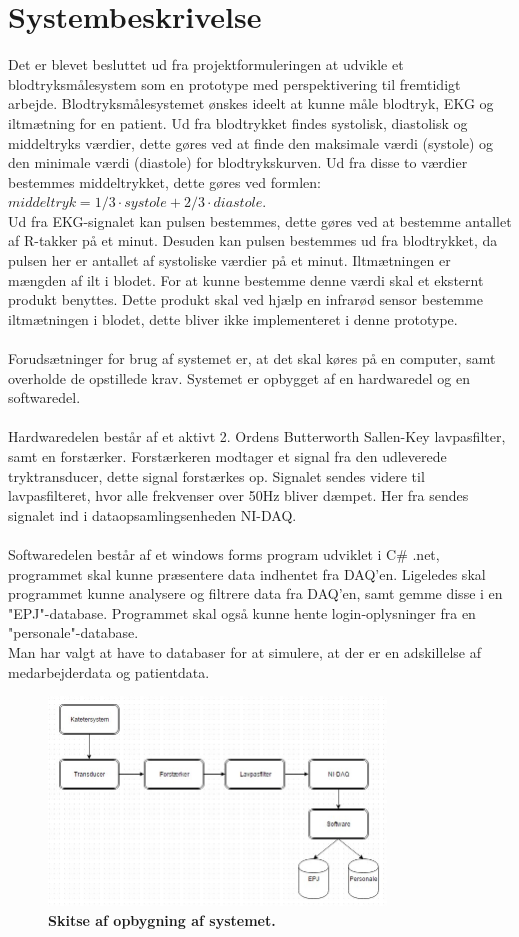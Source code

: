 \section{Systembeskrivelse}
Det er blevet besluttet ud fra projektformuleringen at udvikle et blodtryksmålesystem som en prototype med perspektivering til fremtidigt arbejde. Blodtryksmålesystemet ønskes ideelt at kunne måle blodtryk, EKG og iltmætning for en patient. Ud fra blodtrykket findes systolisk, diastolisk og middeltryks værdier, dette gøres ved at finde den maksimale værdi (systole) og den minimale værdi (diastole) for blodtrykskurven. Ud fra disse to værdier bestemmes middeltrykket, dette gøres ved formlen: $middeltryk = 1/3 \cdot systole + 2/3 \cdot diastole$. \cite{blodtrykwiki}
\\ 
Ud fra EKG-signalet kan pulsen bestemmes, dette gøres ved at bestemme antallet af R-takker på et minut. Desuden kan pulsen bestemmes ud fra blodtrykket, da pulsen her er antallet af systoliske værdier på et minut. Iltmætningen er mængden af ilt i blodet. For at kunne bestemme denne værdi skal et eksternt produkt benyttes. Dette produkt skal ved hjælp en infrarød sensor bestemme iltmætningen i blodet, dette bliver ikke implementeret i denne prototype.\\\\
Forudsætninger for brug af systemet er, at det skal køres på en computer, samt overholde de opstillede krav. Systemet er opbygget af en hardwaredel og en softwaredel. \\\\
Hardwaredelen består af et aktivt 2. Ordens Butterworth Sallen-Key lavpasfilter, samt en forstærker. Forstærkeren modtager et signal fra den udleverede tryktransducer, dette signal forstærkes op. Signalet sendes videre til lavpasfilteret, hvor alle frekvenser over 50Hz bliver dæmpet. Her fra sendes signalet ind i dataopsamlingsenheden NI-DAQ.\\\\
Softwaredelen består af et windows forms program udviklet i C\# .net, programmet skal kunne præsentere data indhentet fra DAQ’en. Ligeledes skal programmet kunne analysere og filtrere data fra DAQ’en, samt gemme disse i en "EPJ"-database. Programmet skal også kunne hente login-oplysninger fra en "personale"-database. \\
Man har valgt at have to databaser for at simulere, at der er en adskillelse af medarbejderdata og patientdata.
\begin{figure}[H]
\includegraphics[width =0.8\textwidth , center]{billeder/system}
\caption{\textbf{Skitse af opbygning af systemet.}}
\end{figure}
\newpage
